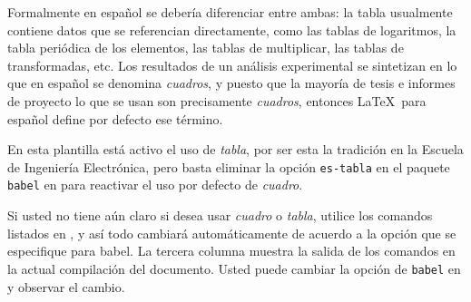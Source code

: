 Formalmente en español se debería diferenciar entre ambas: la tabla
usualmente contiene datos que se referencian directamente, como las
tablas de logaritmos, la tabla periódica de los elementos, las tablas
de multiplicar, las tablas de transformadas, etc.  Los resultados de
un análisis experimental se sintetizan en lo que en español se
denomina \emph{cuadros}, y puesto que la mayoría de tesis e informes
de proyecto lo que se usan son precisamente \emph{cuadros}, entonces
\LaTeX\ para español define por defecto ese término.

En esta plantilla está activo el uso de \emph{tabla}, por ser esta la
tradición en la Escuela de Ingeniería Electrónica, pero basta eliminar
la opción \verb+es-tabla+ en el paquete \verb+babel+ en
 para reactivar el uso por defecto de \emph{cuadro}.

Si usted no tiene aún claro si desea usar \emph{cuadro} o
\emph{tabla}, utilice los comandos listados en
, y así todo cambiará automáticamente de
acuerdo a la opción que se especifique para babel.  La tercera columna
muestra la salida de los comandos en la actual compilación del
documento.  Usted puede cambiar la opción de \verb+babel+ en
 y observar el cambio.

